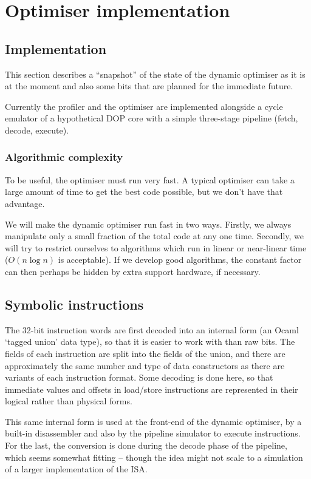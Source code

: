 \chapter{Optimiser implementation}

\section{Implementation}

This section describes a ``snapshot'' of the state of the dynamic optimiser as it is at the moment and also some bits that are planned for the immediate future.

Currently the profiler and the optimiser are implemented alongside a cycle emulator of a hypothetical DOP core with a simple three-stage pipeline (fetch, decode, execute).

\subsection{Algorithmic complexity}

To be useful, the optimiser must run very fast. A typical optimiser can take a large amount of time to get the best code possible, but we don't have that advantage.

We will make the dynamic optimiser run fast in two ways. Firstly, we always manipulate only a small fraction of the total code at any one time. Secondly, we will try to restrict ourselves to algorithms which run in linear or near-linear time ($O(n \log n)$ is acceptable). If we develop good algorithms, the constant factor can then perhaps be hidden by extra support hardware, if necessary.

\section{Symbolic instructions}

The 32-bit instruction words are first decoded into an internal form (an Ocaml `tagged union' data type), so that it is easier to work with than raw bits. The fields of each instruction are split into the fields of the union, and there are approximately the same number and type of data constructors as there are variants of each instruction format. Some decoding is done here, so that immediate values and offsets in load/store instructions are represented in their logical rather than physical forms.

This same internal form is used at the front-end of the dynamic optimiser, by a built-in disassembler and also by the pipeline simulator to execute instructions. For the last, the conversion is done during the decode phase of the pipeline, which seems somewhat fitting -- though the idea might not scale to a simulation of a larger implementation of the ISA.

